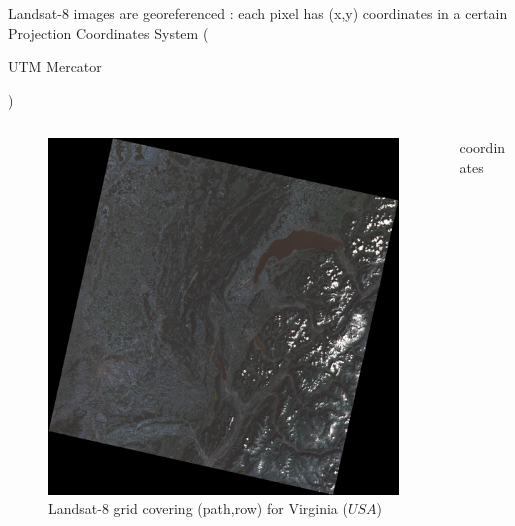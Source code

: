 \documentclass[c]{beamer}
\begin{document}
\begin{frame}
Landsat-8 images are georeferenced : each pixel has (x,y) coordinates in a certain Projection Coordinates 
System (\begin{itshape}UTM Mercator\end{itshape})\\
\begin{columns}

\begin{column}{5cm}
\begin{figure}
  \includegraphics[scale=0.2]{images/georeferencing/Thonon_landsat.png}
  \caption{Landsat-8 grid covering (path,row) for Virginia ($USA$) }
\end{figure}
\end{column}

\begin{column}{5cm}
\begin{block}{coordinates}
 \end{block}
\end{column}

\end{columns}

\end{frame}
\end{document}
